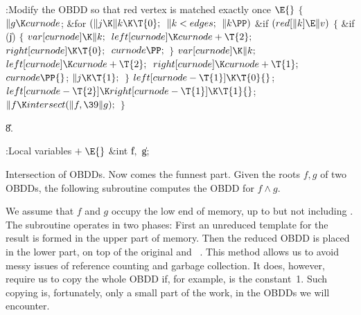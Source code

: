\Y\B\4:Modify the OBDD so that red vertex  is matched exactly once%
\X${}\E{}$\6
${}\{{}$\1\6
${}\|g\K\\{curnode}{}$;\6
\&{for} ${}(\|j\K\|k\K\T{0};{}$ ${}\|k<\\{edges};{}$ ${}\|k\PP){}$\1\6
\&{if} ${}(\\{red}[\|k]\E\|v){}$\5
${}\{{}$\1\6
\&{if} (\|j)\5
${}\{{}$\1\6
${}\\{var}[\\{curnode}]\K\|k;{}$\6
${}\\{left}[\\{curnode}]\K\\{curnode}+\T{2};{}$\6
${}\\{right}[\\{curnode}]\K\T{0};{}$\6
${}\\{curnode}\PP;{}$\6
\4${}\}{}$\2\6
${}\\{var}[\\{curnode}]\K\|k;{}$\6
${}\\{left}[\\{curnode}]\K\\{curnode}+\T{2};{}$\6
${}\\{right}[\\{curnode}]\K\\{curnode}+\T{1};{}$\6
${}\\{curnode}\PP{}$;\6
${}\|j\K\T{1};{}$\6
\4${}\}{}$\2\2\6
${}\\{left}[\\{curnode}-\T{1}]\K\T{0}{}$;\6
${}\\{left}[\\{curnode}-\T{2}]\K\\{right}[\\{curnode}-\T{1}]\K\T{1}{}$;\6
${}\|f\K\\{intersect}(\|f,\39\|g);{}$\6
\4${}\}{}$\2\par
\U8.\fi

\B{}:Local variables\X${}\mathrel+\E{}$\6
\&{int} \|f${},{}$ \|g;\par
\fi

Intersection of OBDDs. Now comes the funnest part. Given the roots
$f,g$ of
two OBDDs, the following subroutine computes the OBDD for $f\land g$.

We assume that $f$ and $g$ occupy the low end of memory, up to but not
including . The subroutine operates in two phases: First an
unreduced
template for the result is formed in the upper part of memory. Then the
reduced OBDD is placed in the lower part, on top of the original  and~%
.
This method allows us to avoid messy issues of reference counting and garbage
collection. It does, however, require us to copy the whole OBDD if, for
example,  is the constant~1. Such copying is, fortunately, only a small
part of the work, in the OBDDs we will encounter.

